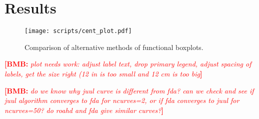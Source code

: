 \documentclass[12pt]{article}
\newcommand{\comment}{\showcomment}
\newcommand{\showcomment}[3]{\textcolor{#1}{\textbf{[#2: }\textsl{#3}\textbf{]}}}
\newcommand{\bmb}[1]{\comment{red}{BMB}{#1}}
\theoremstyle{definition} %
\begin{document}
\section{Results}

\begin{figure}[h!]
\centering
\texttt{[image: scripts/cent\_plot.pdf]}
\caption{Comparison of alternative methods of functional boxplots.}\label{p.a}
\end{figure}
\bmb{plot needs work: adjust label text, drop primary legend, adjust spacing of labels, get the size right (12 in is too small and 12 cm is too big}

\bmb{do we know why juul curve is different from fda? can we check and see if juul algorithm converges to fda for ncurves=2, or if fda converges to juul for ncurves=50? do roahd and fda give similar curves?}
  

\end{document}
